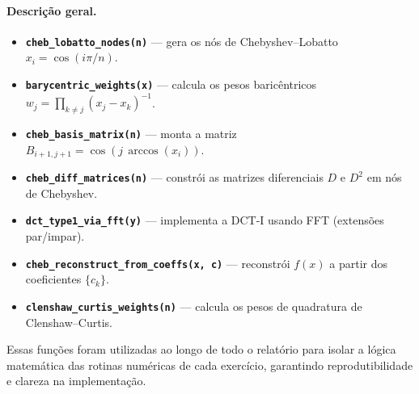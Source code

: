 \documentclass[11pt,a4paper]{article}
\begin{document}
\paragraph{Descrição geral.}
\begin{itemize}
  \item \textbf{\texttt{cheb\_lobatto\_nodes(n)}} — gera os nós de Chebyshev–Lobatto $x_i = \cos(i\pi/n)$.
  \item \textbf{\texttt{barycentric\_weights(x)}} — calcula os pesos baricêntricos $w_j = \prod_{k\neq j}(x_j-x_k)^{-1}$.
  \item \textbf{\texttt{cheb\_basis\_matrix(n)}} — monta a matriz $B_{i+1,j+1}=\cos(j\,\arccos(x_i))$.
  \item \textbf{\texttt{cheb\_diff\_matrices(n)}} — constrói as matrizes diferenciais $D$ e $D^2$ em nós de Chebyshev.
  \item \textbf{\texttt{dct\_type1\_via\_fft(y)}} — implementa a DCT-I usando FFT (extensões par/impar).
  \item \textbf{\texttt{cheb\_reconstruct\_from\_coeffs(x, c)}} — reconstrói $f(x)$ a partir dos coeficientes $\{c_k\}$.
  \item \textbf{\texttt{clenshaw\_curtis\_weights(n)}} — calcula os pesos de quadratura de Clenshaw–Curtis.
\end{itemize}

Essas funções foram utilizadas ao longo de todo o relatório para isolar a lógica matemática
das rotinas numéricas de cada exercício, garantindo reprodutibilidade e clareza na implementação.
\end{document}
